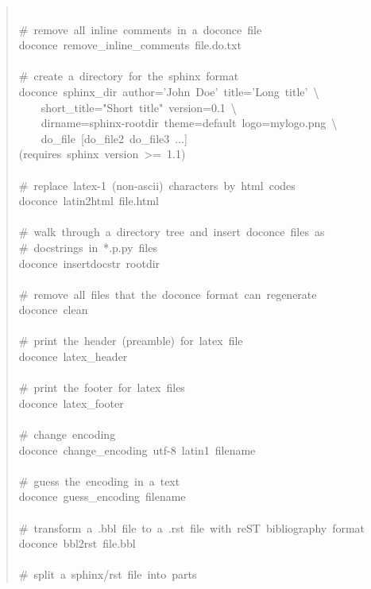 \documentclass[a4paper]{article}
\begin{document}
\begin{quote}
{~\\
\#~remove~all~inline~comments~in~a~doconce~file\\
doconce~remove\_inline\_comments~file.do.txt\\
~\\
\#~create~a~directory~for~the~sphinx~format\\
doconce~sphinx\_dir~author='John~Doe'~title='Long~title'~\textbackslash{}\\
~~~~short\_title="Short~title"~version=0.1~\textbackslash{}\\
~~~~dirname=sphinx-rootdir~theme=default~logo=mylogo.png~\textbackslash{}\\
~~~~do\_file~{[}do\_file2~do\_file3~...{]}\\
(requires~sphinx~version~>=~1.1)\\
~\\
\#~replace~latex-1~(non-ascii)~characters~by~html~codes\\
doconce~latin2html~file.html\\
~\\
\#~walk~through~a~directory~tree~and~insert~doconce~files~as\\
\#~docstrings~in~*.p.py~files\\
doconce~insertdocstr~rootdir\\
~\\
\#~remove~all~files~that~the~doconce~format~can~regenerate\\
doconce~clean\\
~\\
\#~print~the~header~(preamble)~for~latex~file\\
doconce~latex\_header\\
~\\
\#~print~the~footer~for~latex~files\\
doconce~latex\_footer\\
~\\
\#~change~encoding\\
doconce~change\_encoding~utf-8~latin1~filename\\
~\\
\#~guess~the~encoding~in~a~text\\
doconce~guess\_encoding~filename\\
~\\
\#~transform~a~.bbl~file~to~a~.rst~file~with~reST~bibliography~format\\
doconce~bbl2rst~file.bbl\\
~\\
\#~split~a~sphinx/rst~file~into~parts\\
}
\end{quote}
\end{document}
